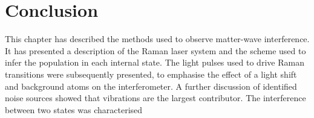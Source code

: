 \section{Conclusion}
This chapter has described the methods used to observe matter-wave
interference. It has presented a description of the Raman laser system
and the scheme used to infer the population in each internal state. 
The light pulses used to drive Raman
transitions were subsequently presented, to emphasise the effect of
a light shift and background atoms on the interferometer. A further
discussion of identified noise sources showed that vibrations are the
largest contributor. The interference between two states was
characterised
